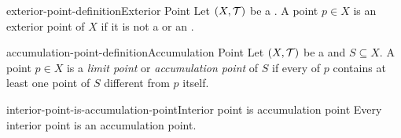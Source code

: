 \documentclass[preview]{standalone}
\begin{document}

\begin{snippetdefinition}{exterior-point-definition}{Exterior Point}
    Let \({(X, \mathcal{T})}\) be a \topologicalspace.
    A point \(p \in X\) is an exterior point of \(X\) if it is not a \boundarypoint
    or an \interiorpoint.
\end{snippetdefinition}

\begin{snippetdefinition}{accumulation-point-definition}{Accumulation Point}
    Let \({(X, \mathcal{T})}\) be a \topologicalspace and \(S \subseteq X\).
    A point \(p \in X\) is a \textit{limit point} or \textit{accumulation point} of \(S\)
    if every \neighborhood of \(p\) contains at least one point of \(S\) different from \(p\) itself.
\end{snippetdefinition}

\begin{snippetproposition}{interior-point-is-accumulation-point}{Interior point is accumulation point}
    Every interior point is an accumulation point. %
\end{snippetproposition}
\end{document}
